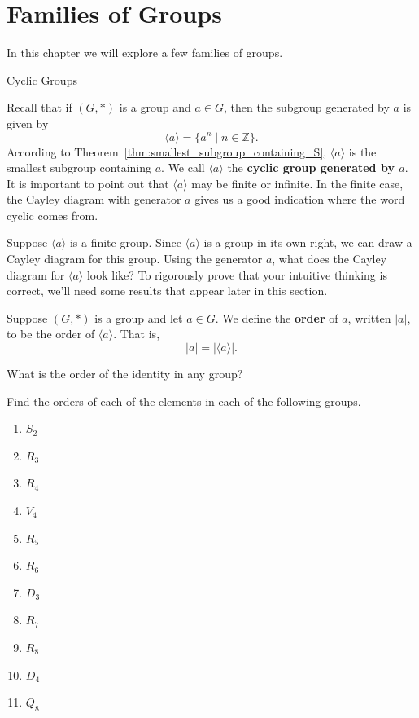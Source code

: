 \chapter{Families of Groups}
\label{chapter:families}
\thispagestyle{empty}

In this chapter we will explore a few families of groups.

\begin{section}{Cyclic Groups}

Recall that if $(G,*)$ is a group and $a\in G$, then the subgroup generated by $a$ is given by
\[
\langle a\rangle =\{a^n\mid n\in\mathbb{Z}\}.
\]
According to Theorem~\ref{thm:smallest_subgroup_containing_S}, $\langle a\rangle$ is the smallest subgroup containing $a$.  We call $\langle a\rangle$ the \textbf{cyclic group generated by $a$}.  It is important to point out that $\langle a\rangle$ may be finite or infinite. In the finite case, the Cayley diagram with generator $a$ gives us a good indication where the word cyclic comes from.

\begin{exercise}
Suppose $\langle a\rangle$ is a finite group.  Since $\langle a\rangle$ is a group in its own right, we can draw a Cayley diagram for this group.  Using the generator $a$, what does the Cayley diagram for $\langle a\rangle$ look like? To rigorously prove that your intuitive thinking is correct, we'll need some results that appear later in this section.
\end{exercise}

\begin{definition}
Suppose $(G,*)$ is a group and let $a\in G$.  We define the \textbf{order} of $a$, written $|a|$, to be the order of $\langle a\rangle$.  That is,
\[
|a|=|\langle a\rangle|.
\]
\end{definition}

\begin{exercise}
What is the order of the identity in any group?
\end{exercise}

\begin{exercise}\label{exer:computing_orders}
Find the orders of each of the elements in each of the following groups.
\begin{multicols}{2}
\begin{enumerate}[label=\rm{(\alph*)}]
\item $S_2$
\item $R_3$
\item $R_4$
\item $V_4$
\item $R_5$
\item $R_6$
\item $D_3$
\item $R_7$
\item $R_8$
\item $D_4$
\item $Q_8$
\end{enumerate}
\end{multicols}
\end{exercise}


\end{section}
